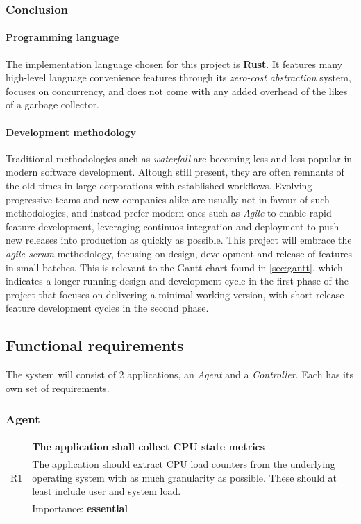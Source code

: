 \documentclass[12pt,a4paper,table]{article}
\begin{document}
            \subsubsection{Conclusion}
                \paragraph{Programming language}
                    The implementation language chosen for this project is \textbf{Rust}. It features many high-level language convenience features through its \textit{zero-cost abstraction} system, focuses on concurrency, and does not come with any added overhead of the likes of a garbage collector.

                \paragraph{Development methodology}
                    Traditional methodologies such as \textit{waterfall} are becoming less and less popular in modern software development. Altough still present, they are often remnants of the old times in large corporations with established workflows. Evolving progressive teams and new companies alike are usually not in favour of such methodologies, and instead prefer modern ones such as \textit{Agile} to enable rapid feature development, leveraging continuos integration and deployment to push new releases into production as quickly as possible. This project will embrace the \textit{agile-scrum} methodology, focusing on design, development and release of features in small batches. This is relevant to the Gantt chart found in \autoref{sec:gantt}, which indicates a longer running design and development cycle in the first phase of the project that focuses on delivering a minimal working version, with short-release feature development cycles in the second phase.

        \subsection{Functional requirements}
            The system will consist of 2 applications, an \textit{Agent} and a \textit{Controller}. Each has its own set of requirements.

            \subsubsection{Agent}
                \begin{tabular}{ p{0.7cm}|p{14.5cm} }
                    \multirow{3}{*}{R1 } & \textbf{The application shall collect CPU state metrics}\\
                    \cline{2-2}
                    & The application should extract CPU load counters from the underlying operating system with as much granularity as possible. These should at least include user and system load.\\
                    \cline{2-2}
                    & Importance: \textbf{essential}
                \end{tabular}
\end{document}
